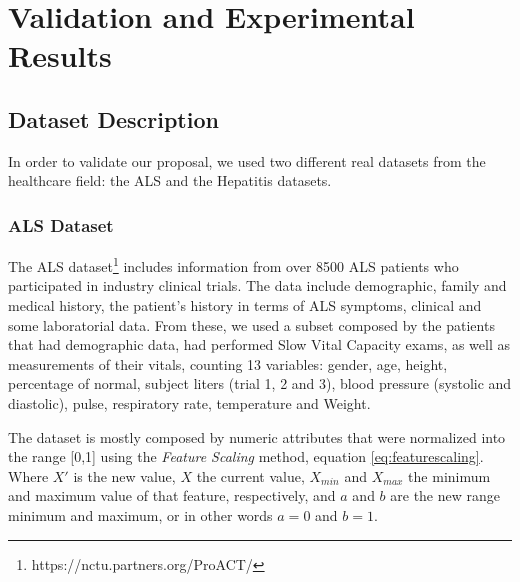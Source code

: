 
\chapter{Validation and Experimental Results}
\label{chapter:results}


\section{Dataset Description}
\label{section:datasets}
In order to validate our proposal, we used two different real datasets from the healthcare field: the ALS and the Hepatitis datasets.

\subsection{ALS Dataset}
\label{subsection:als}

The ALS dataset\footnote{https://nctu.partners.org/ProACT/} includes information from over 8500 ALS patients who participated in industry
 clinical trials. The data include demographic, family and medical history, the patient's history in terms of ALS symptoms,
 clinical and some laboratorial data. From these, we used a subset composed by the patients that had demographic data, had 
 performed Slow Vital Capacity exams, as well as measurements of their vitals, counting 13 variables: gender, age, height, 
 percentage of normal, subject liters (trial 1, 2 and 3), blood pressure (systolic and diastolic), pulse, respiratory rate,
 temperature and Weight. 
 
 The dataset is mostly composed by numeric attributes that were normalized into the range [0,1] using the \emph{Feature Scaling} method, equation \ref{eq:featurescaling}. Where $X'$ is the new value, $X$ the current value, $X_{min}$ and $X_{max}$ the minimum and maximum value of that feature, respectively, and $a$ and $b$ are the new range minimum and maximum, or in other words $a=0$ and $b=1$. 
 
